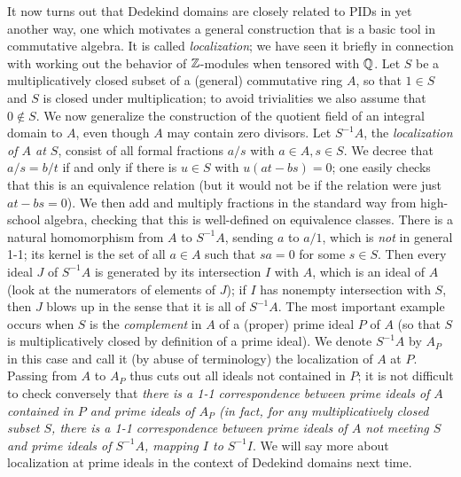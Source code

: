 It now turns out that Dedekind domains are closely related to PIDs in yet another way, one which motivates a general construction that is a basic tool in commutative algebra.  It is called
{\sl localization}; we have seen it briefly in connection with working out the behavior of $\Bbb Z$-modules when tensored with $\Bbb Q$.  Let $S$ be a multiplicatively closed subset of a (general) commutative ring $A$, so that $1\in S$ and $S$ is closed under multiplication; to avoid trivialities we also assume that $0\notin S$.  We now generalize the construction of the quotient field of an integral domain to $A$, even though $A$ may contain zero divisors.  Let $S^{-1}A$, the {\sl localization of $A$ at $S$}, consist of all formal fractions $a/s$ with $a\in A, s\in S$.  We decree that $a/s = b/t$ if and only if there is $u\in S$ with $u(at - bs) = 0$; one easily checks that this is an equivalence relation (but it would not be if the relation were just $at - bs = 0$).  We then add and multiply fractions in the standard way from high-school algebra, checking that this is well-defined on equivalence classes.  There is a natural homomorphism from $A$ to $S^{-1}A$, sending $a$ to $a/1$, which is {\sl not} in general 1-1; its kernel is the set of all $a\in A$ such that $sa = 0$ for some $s\in S$.  Then every ideal $J$ of $S^{-1}A$ is generated by its intersection $I$ with $A$, which is an ideal of $A$ (look at the numerators of elements of $J$); if $I$ has nonempty intersection with $S$, then $J$ blows up in the sense that it is all of $S^{-1}A$.  The most important example occurs when $S$ is the {\sl complement} in $A$ of a (proper) prime ideal $P$ of $A$ (so that $S$ is multiplicatively closed by definition of a prime ideal).  We denote $S^{-1}A$ by $A_P$ in this case and call it (by abuse of terminology) the localization of $A$ at $P$.  Passing from $A$ to $A_P$ thus cuts out all ideals not contained in $P$; it is not difficult to check conversely that {\sl there is a 1-1 correspondence between prime ideals of $A$ contained in $P$ and prime ideals of $A_P$ (in fact, for any multiplicatively closed subset $S$, there is a 1-1 correspondence between prime ideals of $A$ not meeting $S$ and prime ideals of $S^{-1}A$, mapping $I$ to $S^{-1}I$}.  We will say more about localization at prime ideals in the context of Dedekind domains next time.